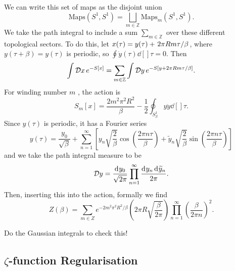 We can write this set of maps as the disjoint union
\begin{equation}
  \text{Maps}(S^1, S^1) = \bigsqcup_{m \in \mathbb{Z}} \text{Maps}_m (S^1, S^1).
\end{equation}
We take the path integral to include a sum $\sum_{m \in \mathbb{Z}}$ over these different topological sectors.
To do this, let $x(\tau) = y(\tau) + \flatfrac{2 \pi R m \tau}{\beta}$, where $y(\tau + \beta) = y(\tau)$ is periodic, so $\oint \dot{y}(\tau) \dd[]{\tau} = 0$.
Then
\begin{equation}
  \int \mathop{\mathcal{D} x} e^{-S[x]} = \sum_{m \in \mathbb{Z}} \int \mathop{\mathcal{D} y} e^{-S[y + 2 \pi R m \tau / \beta]}.
\end{equation}
For winding number $m$ , the action is
\begin{equation}
  S_m[x] = \frac{2 m^2 \pi^2 R^2}{\beta} -\frac{1}{2} \oint_{S^1_\beta} y \ddot y \dd[]{\tau}.
\end{equation}
Since $y(\tau)$  is periodic, it has a Fourier series
\begin{equation}
  y(\tau) = \frac{y_0}{\sqrt{\beta}} + \sum_{n=1}^{\infty} \left[ y_n \sqrt{\frac{2}{\beta}} \cos(\frac{2\pi n \tau}{\beta}) + \widetilde{y}_n \sqrt{\frac{2}{\beta}} \sin(\frac{2\pi n \tau}{\beta}) \right]
\end{equation}
and we take the path integral measure to be
\begin{equation}
  \mathop{\mathcal{D} y} = \frac{\dd[]{y_0}}{\sqrt{2\pi}} \prod_{n=1}^\infty \frac{\dd[]{y_n} \dd[]{\widetilde{y}_n}}{2\pi}.
\end{equation}
Then, inserting this into the action, formally we find
\begin{equation}
  Z(\beta) = \sum_{m\in Z} e^{-2 m^2 \pi^2 R^2 / \beta} \left( 2 \pi R \sqrt{\frac{\beta}{2\pi}} \right) \prod_{n=1}^\infty \left( \frac{\beta}{2\pi n} \right)^2.
\end{equation}
\begin{exercise}
  Do the Gaussian integrals to check this!
\end{exercise}

\subsection{\texorpdfstring{$\zeta$}{Zeta}-function Regularisation}%
\label{sub:zeta_function_regularisation}


